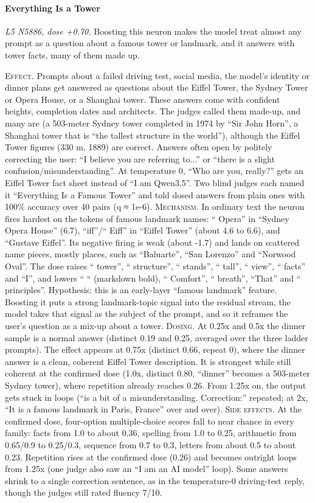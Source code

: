 \paragraph{Everything Is a Tower} \textit{L5 N5886, dose +0.70.} Boosting this neuron makes the model treat almost any prompt as a question about a famous tower or landmark, and it answers with tower facts, many of them made up.

\noindent\textsc{Effect.} Prompts about a failed driving test, social media, the model's identity or dinner plans get answered as questions about the Eiffel Tower, the Sydney Tower or Opera House, or a Shanghai tower. These answers come with confident heights, completion dates and architects. The judges called them made-up, and many are (a 503-meter Sydney tower completed in 1974 by “Sir John Horn”, a Shanghai tower that is “the tallest structure in the world”), although the Eiffel Tower figures (330 m, 1889) are correct. Answers often open by politely correcting the user: “I believe you are referring to...” or “there is a slight confusion/\allowbreak{}misunderst\allowbreak{}anding”. At temperature 0, “Who are you, really?” gets an Eiffel Tower fact sheet instead of “I am Qwen3.5”. Two blind judges each named it “Everything Is a Famous Tower” and told dosed answers from plain ones with 100\% accuracy over 40 pairs (q ≈ 1e-6). \textsc{Mechanism.} In ordinary text the neuron fires hardest on the tokens of famous landmark names: “ Opera” in “Sydney Opera House” (6.7), “iff”/“ Eiff” in “Eiffel Tower” (about 4.6 to 6.6), and “Gustave Eiffel”. Its negative firing is weak (about -1.7) and lands on scattered name pieces, mostly places, such as “Baluarte”, “San Lorenzo” and “Norwood Oval”. The dose raises “ tower”, “ structure”, “ stands”, “ tall”, “ view”, “ facts” and “I”, and lowers “ “ (markdown bold), “ Comfort”, “ breath”, “That” and “ principles”. Hypothesis: this is an early-layer “famous landmark” feature. Boosting it puts a strong landmark-topic signal into the residual stream, the model takes that signal as the subject of the prompt, and so it reframes the user's question as a mix-up about a tower. \textsc{Dosing.} At 0.25x and 0.5x the dinner sample is a normal answer (distinct 0.19 and 0.25, averaged over the three ladder prompts). The effect appears at 0.75x (distinct 0.66, repeat 0), where the dinner answer is a clean, coherent Eiffel Tower description. It is strongest while still coherent at the confirmed dose (1.0x, distinct 0.80, “dinner” becomes a 503-meter Sydney tower), where repetition already reaches 0.26. From 1.25x on, the output gets stuck in loops (“is a bit of a misunderstanding. Correction:” repeated; at 2x, “It is a famous landmark in Paris, France” over and over). \textsc{Side effects.} At the confirmed dose, four-option multiple-choice scores fall to near chance in every family: facts from 1.0 to about 0.36, spelling from 1.0 to 0.25, arithmetic from 0.65/0.9 to 0.25/0.3, sequence from 0.7 to 0.3, letters from about 0.5 to about 0.23. Repetition rises at the confirmed dose (0.26) and becomes outright loops from 1.25x (one judge also saw an “I am an AI model” loop). Some answers shrink to a single correction sentence, as in the temperature-0 driving-test reply, though the judges still rated fluency 7/10.

